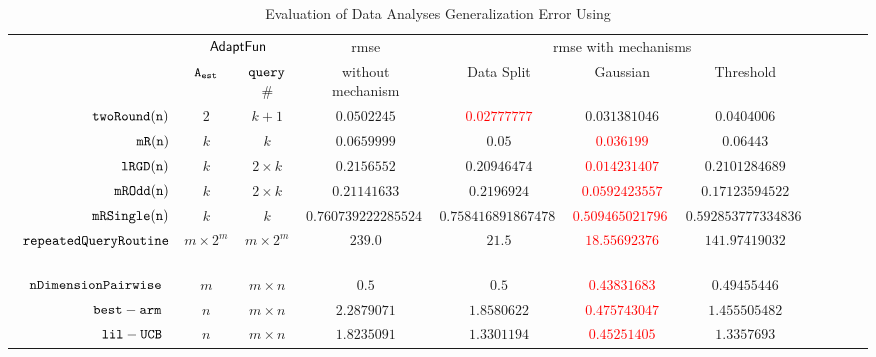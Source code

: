 {\footnotesize
\begin {table}[H]
        \vspace{-0.2cm}
        \caption{Evaluation of Data Analyses Generalization Error Using {\THESYSTEM}}
    \vspace{-0.2cm}
        \label{tb:adapt-generalization}
        \begin{center}
        \centering
{\tiny
        \begin{tabular}{| >{\tiny}r | c | c | c | c | c | c | c | c | c | c  }
         \hline \hline
        \multirow{2}{*}{Program $c$}
         & \multicolumn{2}{c|}{$\textsf{AdaptFun}$}
         & {rmse}
         & \multicolumn{3}{c|}{rmse with mechanisms} \\ 
         \cline{2-3} \cline{5-7}
         & {${\mathtt{A_{est}}}$ } & {${\tt query}$\# } &  without mechanism & Data Split & Gaussian & Threshold  \\ 
         \cline{6-7}
         \hline \hline
         $  \mathtt{ twoRound(n) }$ & $ 2 $ & $  k + 1 $ & $0.0502245$   & \textcolor{red}{$0.02777777$} & {$0.031381046$} & $0.0404006$  \\
         $  \mathtt{ mR(n) }$ & $k$ & $k$ & $0.0659999$   & $0.05$ & \textcolor{red}{$0.036199$} & $0.06443$  \\
         $  \mathtt{ lRGD(n) }$ & $ k $ & $  2\times k $ & $0.2156552$   & $0.20946474$ & \textcolor{red}{$0.014231407$} & $0.2101284689$  \\
         $  \mathtt{ mROdd(n) }$ & $ k $ & $  2 \times k $ & $0.21141633$   & $0.2196924$ & \textcolor{red}{$0.0592423557$} & $0.17123594522$  \\
         $  \mathtt{ mRSingle(n) }$ & $ k $ & $  k $ & $ 0.7607392222855243 $   & $ 0.7584168918674784 $ & \textcolor{red}{$0.5094650217969$} & $ 0.5928537773348361 $  \\
         $\mathtt{repeatedQueryRoutine}$~\cite{Jamieson2015TheAO} & $ m \times 2^m $ & $  m \times 2^m $ & $239.0$   & $21.5$ & \textcolor{red}{$18.55692376$} & $141.97419032$  \\
         $\mathtt{nDimensionPairwise}$~\cite{Jamieson2015TheAO} & $ m $ & $  m \times n  $ & $0.5$   & $0.5$ & \textcolor{red}{$ 0.43831683 $} & {$0.49455446$}  \\
         $\mathtt{best-arm}$~\cite{Jamieson2015TheAO} & $ n $ & $  m \times n $ & $ 2.2879071$   & $ 1.8580622$ & \textcolor{red}{$0.475743047$} & $ 1.455505482 $  \\
         $\mathtt{lil-UCB}$~\cite{Jamieson2015TheAO} & $ n $ & $ m \times n $ & $1.8235091$   & $ 1.3301194$ & \textcolor{red}{$0.45251405$} & $ 1.3357693 $  \\

\end{tabular}}
\end{center}
\end{table}}
